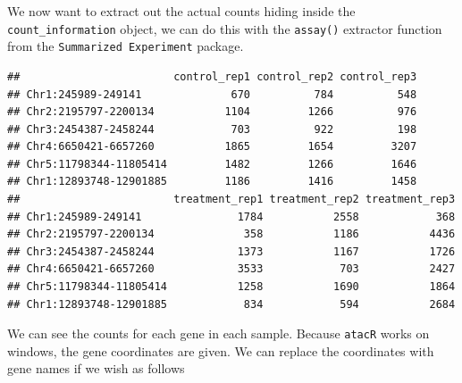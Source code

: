 \documentclass[]{book}
\newenvironment{Shaded}{\begin{snugshade}}{\end{snugshade}}
\newcommand{\DataTypeTok}[1]{\textcolor[rgb]{0.13,0.29,0.53}{#1}}
\newcommand{\KeywordTok}[1]{\textcolor[rgb]{0.13,0.29,0.53}{\textbf{#1}}}
\newcommand{\NormalTok}[1]{#1}
\newcommand{\OperatorTok}[1]{\textcolor[rgb]{0.81,0.36,0.00}{\textbf{#1}}}
\newcommand{\OtherTok}[1]{\textcolor[rgb]{0.56,0.35,0.01}{#1}}
\newcommand{\StringTok}[1]{\textcolor[rgb]{0.31,0.60,0.02}{#1}}
\begin{document}
We now want to extract out the actual counts hiding inside the \texttt{count\_information} object, we can do this with the \texttt{assay()} extractor function from the \texttt{Summarized\ Experiment} package.

\begin{Shaded}
\end{Shaded}

\begin{verbatim}
##                        control_rep1 control_rep2 control_rep3
## Chr1:245989-249141              670          784          548
## Chr2:2195797-2200134           1104         1266          976
## Chr3:2454387-2458244            703          922          198
## Chr4:6650421-6657260           1865         1654         3207
## Chr5:11798344-11805414         1482         1266         1646
## Chr1:12893748-12901885         1186         1416         1458
##                        treatment_rep1 treatment_rep2 treatment_rep3
## Chr1:245989-249141               1784           2558            368
## Chr2:2195797-2200134              358           1186           4436
## Chr3:2454387-2458244             1373           1167           1726
## Chr4:6650421-6657260             3533            703           2427
## Chr5:11798344-11805414           1258           1690           1864
## Chr1:12893748-12901885            834            594           2684
\end{verbatim}

We can see the counts for each gene in each sample. Because \texttt{atacR} works on windows, the gene coordinates are given. We can replace the coordinates with gene names if we wish as follows

\begin{Shaded}
\end{Shaded}
\end{document}
